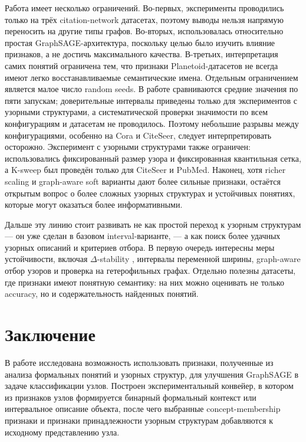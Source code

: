 \documentclass[14pt,a4paper]{extarticle}
\begin{document}
Работа имеет несколько ограничений. Во-первых, эксперименты проводились только
на трёх citation-network датасетах, поэтому выводы нельзя напрямую переносить на
другие типы графов. Во-вторых, использовалась относительно простая
GraphSAGE-архитектура, поскольку целью было изучить влияние признаков, а не
достичь максимального качества. В-третьих, интерпретация самих понятий
ограничена тем, что признаки Planetoid-датасетов не всегда имеют легко
восстанавливаемые семантические имена. Отдельным ограничением является малое
число random seeds. В работе сравниваются средние значения по пяти запускам;
доверительные интервалы приведены только для экспериментов с узорными
структурами, а систематической проверки значимости по всем конфигурациям и
датасетам не проводилось. Поэтому небольшие разрывы между конфигурациями,
особенно на Cora и CiteSeer, следует интерпретировать осторожно. Эксперимент с
узорными структурами также ограничен: использовались фиксированный размер узора и
фиксированная квантильная сетка, а K-sweep был проведён только для CiteSeer и
PubMed. Наконец, хотя richer scaling и graph-aware soft варианты дают более
сильные признаки, остаётся открытым вопрос о более сложных узорных структурах и
устойчивых понятиях, которые могут оказаться более информативными.

Дальше эту линию стоит развивать не как простой переход к узорным структурам ---
он уже сделан в базовом interval-варианте, --- а как поиск более удачных
узорных описаний и критериев отбора. В первую очередь интересны меры устойчивости,
включая $\Delta$-stability \cite{buzmakov2015patternstructures}, интервалы
переменной ширины, graph-aware отбор узоров и проверка на гетерофильных графах.
Отдельно полезны датасеты, где признаки имеют понятную семантику: на них можно
оценивать не только accuracy, но и содержательность найденных понятий.

\section*{Заключение}

В работе исследована возможность использовать признаки, полученные из анализа
формальных понятий и узорных структур, для улучшения GraphSAGE в задаче
классификации узлов. Построен экспериментальный конвейер, в котором из признаков
узлов формируется бинарный формальный контекст или интервальное описание объекта,
после чего выбранные concept-membership признаки и признаки принадлежности
узорным структурам добавляются
к исходному представлению узла.
\end{document}
